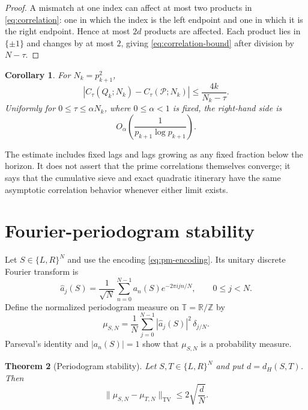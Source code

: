 \documentclass[11pt]{article}
\newtheorem{theorem}{Theorem}[section]
\newtheorem{corollary}[theorem]{Corollary}
\theoremstyle{definition}
\theoremstyle{remark}
\newcommand{\R}{\mathbb{R}}
\newcommand{\T}{\mathbb{T}}
\newcommand{\cP}{\mathcal{P}}
\newcommand{\TV}{\mathrm{TV}}
\begin{document}
\begin{proof}
A mismatch at one index can affect at most two products in \eqref{eq:correlation}: one in which the index is the left endpoint and one in which it is the right endpoint.  Hence at most $2d$ products are affected.  Each product lies in $\{\pm1\}$ and changes by at most $2$, giving \eqref{eq:correlation-bound} after division by $N-\tau$.
\end{proof}

\begin{corollary}\label{cor:prime-correlations}
For $N_k=p_{k+1}^2$,
\begin{equation}\label{eq:prime-correlation-bound}
    |C_\tau(Q_k;N_k)-C_\tau(\cP;N_k)|
    \le \frac{4k}{N_k-\tau}.
\end{equation}
Uniformly for $0\le\tau\le\alpha N_k$, where $0\le\alpha<1$ is fixed, the right-hand side is
\[
    O_\alpha\!\left(\frac{1}{p_{k+1}\log p_{k+1}}\right).
\]
\end{corollary}

The estimate includes fixed lags and lags growing as any fixed fraction below the horizon.  It does not assert that the prime correlations themselves converge; it says that the cumulative sieve and exact quadratic itinerary have the same asymptotic correlation behavior whenever either limit exists.

\section{Fourier-periodogram stability}

Let $S\in\{L,R\}^N$ and use the encoding \eqref{eq:pm-encoding}.  Its unitary discrete Fourier transform is
\begin{equation}\label{eq:dft}
    \widehat a_j(S)
    =\frac{1}{\sqrt N}\sum_{n=0}^{N-1}
      a_n(S)e^{-2\pi i jn/N},
    \qquad 0\le j<N.
\end{equation}
Define the normalized periodogram measure on $\T=\R/\mathbb Z$ by
\begin{equation}\label{eq:periodogram-measure}
    \mu_{S,N}
    =\frac1N\sum_{j=0}^{N-1}
      |\widehat a_j(S)|^2\,\delta_{j/N}.
\end{equation}
Parseval's identity and $|a_n(S)|=1$ show that $\mu_{S,N}$ is a probability measure.

\begin{theorem}[Periodogram stability]\label{thm:periodogram-stability}
Let $S,T\in\{L,R\}^N$ and put $d=d_H(S,T)$.  Then
\begin{equation}\label{eq:periodogram-tv}
    \|\mu_{S,N}-\mu_{T,N}\|_{\TV}
    \le 2\sqrt{\frac dN}.
\end{equation}
\end{theorem}
\end{document}
